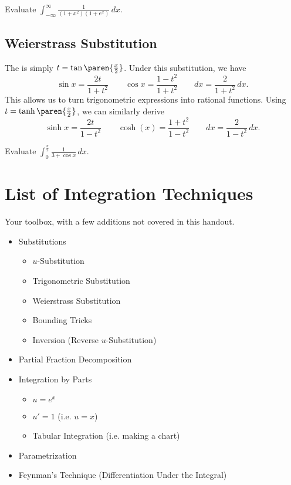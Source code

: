 \documentclass[mast]{lucky}
\begin{document}
\begin{exer}
Evaluate $\int_{-\infty}^{\infty} \frac{1}{(1+x^2)(1+e^x)}\,dx$.
\end{exer}

\subsection{Weierstrass Substitution}
The  is simply $t=\tan\paren{\frac{x}{2}}$. Under this substitution, we have
\[\sin x=\frac{2t}{1+t^2} \qquad \cos x=\frac{1-t^2}{1+t^2} \qquad dx=\frac{2}{1+t^2}\,dx.\]
This allows us to turn trigonometric expressions into rational functions. Using $t=\tanh\paren{\frac{x}{2}}$, we can similarly derive
\[\sinh x=\frac{2t}{1-t^2} \qquad \cosh(x)=\frac{1+t^2}{1-t^2} \qquad dx=\frac{2}{1-t^2}\,dx.\]

\begin{exer}
Evaluate $\int_0^{\frac{\pi}{2}} \frac{1}{3+\cos x}\,dx$.
\end{exer}

\section{List of Integration Techniques}
Your toolbox, with a few additions not covered in this handout.
\begin{itemize}
    \item Substitutions
    \begin{itemize}
        \item $u$-Substitution
        \item Trigonometric Substitution
        \item Weierstrass Substitution
        \item Bounding Tricks
        \item Inversion (Reverse $u$-Substitution)
    \end{itemize}
    \item Partial Fraction Decomposition
    \item Integration by Parts
    \begin{itemize}
        \item $u=e^x$
        \item $u'=1$ (i.e. $u=x$)
        \item Tabular Integration (i.e. making a chart)
    \end{itemize}
    \item Parametrization
    \item Feynman's Technique (Differentiation Under the Integral)
\end{itemize}
\end{document}
